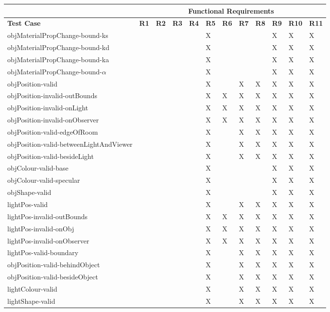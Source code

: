\documentclass[12pt, titlepage]{article}
\begin{document}
\begin{tabular}{|p{5cm}|l|l|l|l|l|l|l|l|l|l|l}
	\hline
	& \multicolumn{11}{c}{Functional Requirements}\\
	\hline
	\textbf{Test Case} & \textbf{R1} & \textbf{R2} & \textbf{R3} & \textbf{R4} 
	& \textbf{R5} & \textbf{R6} & \textbf{R7} & \textbf{R8} & \textbf{R9} & 
	\textbf{R10} & \textbf{R11} \\
	\hline
	objMaterialPropChange-bound-ks & & & & & X & & & & X & X & X\\
	objMaterialPropChange-bound-kd & & & & & X & & & & X & X & X\\
	objMaterialPropChange-bound-ka & & & & & X & & & & X & X & X\\
	objMaterialPropChange-bound-$\alpha$ & & & & & X & & & & X & X & X\\
	objPosition-valid & & & & & X & & X	& X & X & X & X\\	
	objPosition-invalid-outBounds & & & & & X & X & X	& X & X & X & X\\
	objPosition-invalid-onLight & & & & & X & X & X	& X & X & X & X\\			
	objPosition-invalid-onObserver & & & & & X & X & X	& X & X & X & 
	X\\			
	objPosition-valid-edgeOfRoom & & & & & X & & X	& X & X & X & X\\
	objPosition-valid-betweenLightAndViewer & & & & & X & & X	& X & X & X & 
	X\\
	objPosition-valid-besideLight & & & & & X & & X	& X & X & X & X\\
	objColour-valid-base & & & & & X & & & & X & X & X\\	
	objColour-valid-specular & & & & & X & & & & X & X & X\\					
	objShape-valid & & & & & X & & & & X & X & X\\			
	lightPos-valid & & & & & X & & X & X & X & X & X\\	
	lightPos-invalid-outBounds & & & & & X & X & X	& X & X & X & X\\
	lightPos-invalid-onObj & & & & & X & X & X	& X & X & X & X\\			
	lightPos-invalid-onObserver & & & & & X & X & X	& X & X & X & X\\
	lightPos-valid-boundary & & & & & X & & X & X & X & X & X\\
	objPosition-valid-behindObject & & & & & X & & X & X & X & X & X\\
	objPosition-valid-besideObject & & & & & X & & X & X & X & X & X\\
	lightColour-valid & & & & & X & & X & X & X & X & X\\					
	lightShape-valid & & & & & X & & X & X & X & X & 
	X\\
	\hline									
\end{tabular}
\end{document}
